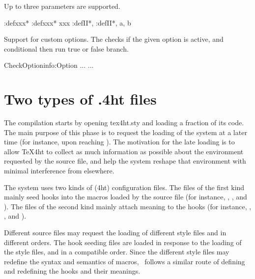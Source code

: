 Up to three parameters are supported.


\begin{texsource}
\newcommand\bar{xxx}
\pend:def\bar{*}
\append:def\bar{*}
\bar
\newcommand\foo[2]{#1, #2}
\pend:defII\foo{*}
\append:defII\foo{*}
\foo{a}{b}

\end{texsource}


Support for custom options. The  checks if the given option
is active, and  conditional then run true or false branch.

\begin{texsource}
\:CheckOption{info}\if:Option
... \else ...
\fi
\end{texsource}
      
\section{Two types of .4ht files}


The compilation starts by opening tex4ht.sty and loading a fraction of its code.
The main purpose of this phase is to request the loading of the system at a
later time (for instance, upon reaching \texcommand{}). The motivation for
the late loading is to allow TeX4ht to collect as much information as possible
about the environment requested by the source file, and help the system reshape
that environment with minimal interference from elsewhere.

The system uses two kinds of (4ht) configuration files. The files of the first
kind mainly seed hooks into the macros loaded by the source file (for instance,
, , and ).
The files of the second kind mainly
attach meaning to the hooks (for instance, , , and
).

Different source files may request the loading of different style files and in
different orders. The hook seeding files are loaded in response to the loading
of the style files, and in a compatible order. Since the different style files
may redefine the syntax and semantics of macros, \texfourht\ follows a similar route
of defining and redefining the hooks and their meanings.


